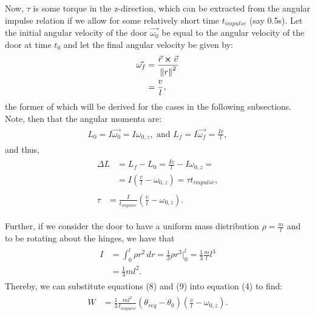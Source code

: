     Now, $\tau$ is some torque in the z-direction, which can be extracted from the angular impulse relation if we allow for some relatively short time $t_{impulse}$ (say 0.5s). Let the initial angular velocity of the door $\vec{\omega_{0}}$ be equal to the angular velocity of the door at time $t_{0}$ and let the final angular velocity be given by:
    \begin{eqnarray}
    \begin{split}
        \vec{\omega_{f}} & = \frac{\vec{r} \cross \vec{v}}{\norm{r}^{2}}\\
        & = \frac{v}{l},
    \end{split}
    \end{eqnarray}
    the former of which will be derived for the cases in the following subsections. Note, then that the angular momenta are:
    \begin{eqnarray}
    \begin{split}
        L_{0}=I\vec{\omega_{0}}=I\omega_{0,z}, \text{ and }  L_{f}=I\vec{\omega_{f}}=\frac{Iv}{l},
    \end{split}
    \end{eqnarray}
    and thus,
    \begin{eqnarray}
    \begin{split}
        \Delta L & = L_{f}-L_{0} = \frac{Iv}{l}-I\omega_{0,z}=\\
        & = I(\frac{v}{l}-\omega_{0,z})=\tau t_{impulse},
    \end{split}\\
    \begin{split}
        \tau & =\frac{I}{t_{impulse}}(\frac{v}{l}-\omega_{0,z}).
    \end{split}
    \end{eqnarray}\par
    Further, if we consider the door to have a uniform mass distribution $\rho=\frac{m}{l}$ and to be rotating about the hinges, we have that
    \begin{eqnarray}
    \begin{split}
        I & =\int_{0}^{l} \rho r^{2} \,dr = \frac{1}{3} \rho r^{3} |_{0}^{l}=\frac{1}{3}\frac{m}{l}l^{3}\\
        & = \frac{1}{3}ml^{2}.
    \end{split}
    \end{eqnarray}
    Thereby, we can substitute equations (8) and (9) into equation (4) to find:
    \begin{eqnarray}
    \begin{split}
        W & =\frac{1}{3}\frac{ml^{2}}{t_{impulse}} (\theta_{req}-\theta_{0}) (\frac{v}{l}-\omega_{0,z}).
    \end{split}
    \end{eqnarray}
